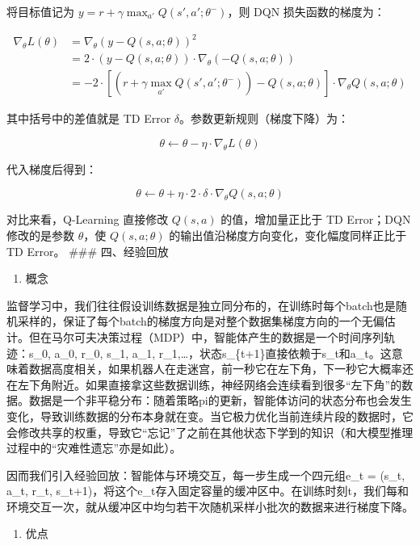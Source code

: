 将目标值记为 \(y=r+\gamma\max_{a'}Q(s',a';\theta^-)\)，则 DQN 损失函数的梯度为：

\[
\begin{aligned}
\nabla_\theta L(\theta)
&=\nabla_\theta\left(y-Q(s,a;\theta)\right)^2\\
&=2\cdot\left(y-Q(s,a;\theta)\right)\cdot\nabla_\theta\left(-Q(s,a;\theta)\right)\\
&=-2\cdot\left[\left(r+\gamma\max_{a'}Q(s',a';\theta^-)\right)-Q(s,a;\theta)\right]\cdot\nabla_\theta Q(s,a;\theta)
\end{aligned}
\]

其中括号中的差值就是 TD Error \(\delta\)。参数更新规则（梯度下降）为：

\[
\theta\leftarrow\theta-\eta\cdot\nabla_\theta L(\theta)
\]

代入梯度后得到：

\[
\theta\leftarrow\theta+\eta\cdot2\cdot\delta\cdot\nabla_\theta Q(s,a;\theta)
\]

对比来看，Q-Learning 直接修改 \(Q(s,a)\) 的值，增加量正比于 TD Error；DQN 修改的是参数 \(\theta\)，使 \(Q(s,a;\theta)\) 的输出值沿梯度方向变化，变化幅度同样正比于 TD Error。
\#\#\# 四、经验回放

\begin{enumerate}
\def\labelenumi{\arabic{enumi}.}
\tightlist
\item
  概念
\end{enumerate}

监督学习中，我们往往假设训练数据是独立同分布的，在训练时每个batch也是随机采样的，保证了每个batch的梯度方向是对整个数据集梯度方向的一个无偏估计。但在马尔可夫决策过程（MDP）中，智能体产生的数据是一个时间序列轨迹：s\_0, a\_0, r\_0, s\_1, a\_1, r\_1,\ldots，状态s\_\{t+1\}直接依赖于s\_t和a\_t。这意味着数据高度相关，如果机器人在走迷宫，前一秒它在左下角，下一秒它大概率还在左下角附近。如果直接拿这些数据训练，神经网络会连续看到很多``左下角''的数据。数据是一个非平稳分布：随着策略pi的更新，智能体访问的状态分布也会发生变化，导致训练数据的分布本身就在变。当它极力优化当前连续片段的数据时，它会修改共享的权重，导致它``忘记''了之前在其他状态下学到的知识（和大模型推理过程中的``灾难性遗忘''亦是如此）。

因而我们引入经验回放：智能体与环境交互，每一步生成一个四元组e\_t = (s\_t, a\_t, r\_t, s\_t+1)，将这个e\_t存入固定容量的缓冲区中。在训练时刻t，我们每和环境交互一次，就从缓冲区中均匀若干次随机采样小批次的数据来进行梯度下降。

\begin{enumerate}
\def\labelenumi{\arabic{enumi}.}
\setcounter{enumi}{1}
\tightlist
\item
  优点
\end{enumerate}

